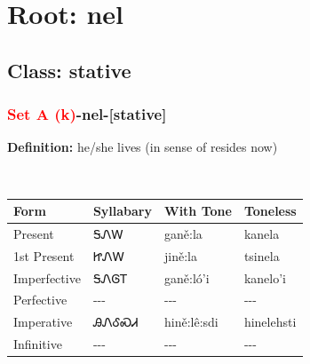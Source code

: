 \needspace{4in}
\section*{Root: nel}
\nopagebreak
{}
\needspace{3in}
\subsection*{Class: stative}
\nopagebreak
\needspace{2in}
\subsubsection*{\textcolor{Red}{Set A (k)}{-}\textbf{nel}{-}[stative]}
\nopagebreak
\textbf{Definition: } he/she lives (in sense of resides now)
\\[0.5em]
\begin{tabularx}{\textwidth}{l X X X}%
\toprule%
\textbf{Form}&\textbf{Syllabary}&\textbf{With Tone}&\textbf{Toneless}\\%
\midrule%
Present&ᎦᏁᎳ&ganě:la&kanela\\%
1st Present&ᏥᏁᎳ&jině:la&tsinela\\%
Imperfective&ᎦᏁᎶᎢ&ganě:ló’i&kanelo'i\\%
Perfective&{-}{-}{-}&{-}{-}{-}&{-}{-}{-}\\%
Imperative&ᎯᏁᎴᏍᏗ&hině:lê:sdi&hinelehsti\\%
Infinitive&{-}{-}{-}&{-}{-}{-}&{-}{-}{-}\\%
\bottomrule%
\end{tabularx}
\\[1em]